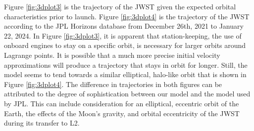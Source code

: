 Figure \ref{fig:3dplot3} is the trajectory of the JWST given the expected orbital characteristics prior to launch\autocite{JWSTHaloOrbit}.
Figure \ref{fig:3dplot4} is the trajectory of the JWST according to the JPL Horizons database from December 26th, 2021 to January 22, 2024\autocite{SEHaloOrbit}.
In Figure \ref{fig:3dplot3}, it is apparent that station-keeping, the use of onboard engines to stay on a specific orbit, is necessary for larger orbits around Lagrange points.
It is possible that a much more precise initial velocity approximations will produce a trajectory that stays in orbit for longer.
Still, the model seems to tend towards a similar elliptical, halo-like orbit that is shown in Figure \ref{fig:3dplot4}.
The difference in trajectories in both figures can be attributed to the degree of sophistication between our model and the model used by JPL.
This can include consideration for an elliptical, eccentric orbit of the Earth, the effects of the Moon's gravity, and orbital eccentricity of the JWST during its transfer to L2.
